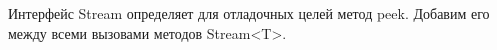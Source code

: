 \begin{frame}[noframenumbering]
\frametitle{\insertsection} 
\framesubtitle{\insertsubsection}
Интерфейс Stream определяет для отладочных целей метод peek. Добавим его между всеми вызовами методов Stream<T>.
\inputminted{java}{code/StreamWithPeeks.java}
\end{frame}
